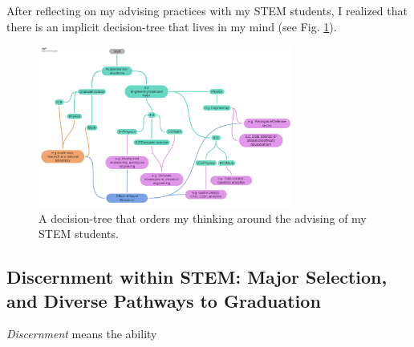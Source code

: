 \documentclass[../../../main.tex]{subfiles}
\begin{document}
After reflecting on my advising practices with my STEM students, I realized that there is an implicit decision-tree that lives in my mind (see Fig. \ref{fig:tree}).

\begin{figure}
\centering
\includegraphics[width=0.75\textwidth]{../../../figures/Advising_tree.pdf}
\caption{\label{fig:tree} A decision-tree that orders my thinking around the advising of my STEM students.}
\end{figure}

\subsection{Discernment within STEM: Major Selection, and Diverse Pathways to Graduation}

\textit{Discernment} means the ability
\end{document}
